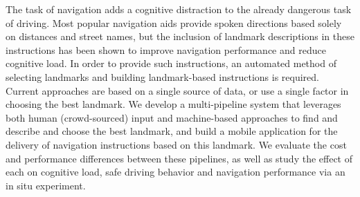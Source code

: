 The task of navigation adds a cognitive distraction to the already dangerous task of driving. Most popular navigation aids provide spoken directions based solely on distances and street names, but the inclusion of landmark descriptions in these instructions has been shown to improve navigation performance and reduce cognitive load. In order to provide such instructions, an automated method of selecting landmarks and building landmark-based instructions is required. Current approaches are based on a single source of data, or use a single factor in choosing the best landmark. We develop a multi-pipeline system that leverages both human (crowd-sourced) input and machine-based approaches to find and describe and choose the best landmark, and build a mobile application for the delivery of navigation instructions based on this landmark. We evaluate the cost and performance differences between these pipelines, as well as study the effect of each on cognitive load, safe driving behavior and navigation performance via an in situ experiment.
